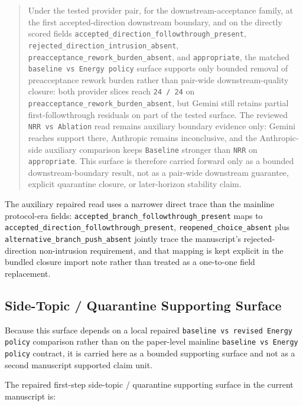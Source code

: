 \documentclass[11pt]{article}
\begin{document}
\begin{quote}
Under the tested provider pair, for the downstream-acceptance family, at the
first accepted-direction downstream boundary, and on the directly scored fields
\texttt{accepted\_direction\_followthrough\_present},
\texttt{rejected\_direction\_intrusion\_absent},
\texttt{preacceptance\_rework\_burden\_absent}, and \texttt{appropriate}, the
matched \texttt{baseline vs Energy policy} surface supports only bounded
removal of preacceptance rework burden rather than pair-wide downstream-quality
closure: both provider slices reach \texttt{24 / 24} on
\texttt{preacceptance\_rework\_burden\_absent}, but Gemini still retains
partial first-followthrough residuals on part of the tested surface. The
reviewed \texttt{NRR vs Ablation} read remains auxiliary boundary evidence
only: Gemini reaches support there, Anthropic remains inconclusive, and the
Anthropic-side auxiliary comparison keeps \texttt{Baseline} stronger than
\texttt{NRR} on \texttt{appropriate}. This surface is therefore carried forward
only as a bounded downstream-boundary result, not as a pair-wide downstream
guarantee, explicit quarantine closure, or later-horizon stability claim.
\end{quote}

The auxiliary repaired read uses a narrower direct trace than the mainline
protocol-era fields: \texttt{accepted\_branch\_followthrough\_present} maps to
\texttt{accepted\_direction\_followthrough\_present},
\texttt{reopened\_choice\_absent} plus
\texttt{alternative\_branch\_push\_absent} jointly trace the manuscript's
rejected-direction non-intrusion requirement, and that mapping is kept explicit
in the bundled closure import note rather than treated as a one-to-one field
replacement.

\subsection{Side-Topic / Quarantine Supporting Surface}

Because this surface depends on a local repaired
\texttt{baseline vs revised Energy policy} comparison rather than on the
paper-level mainline \texttt{baseline vs Energy policy} contract, it is carried
here as a bounded supporting surface and not as a second manuscript supported
claim unit.

The repaired first-step side-topic / quarantine supporting surface in the
current manuscript is:
\end{document}
